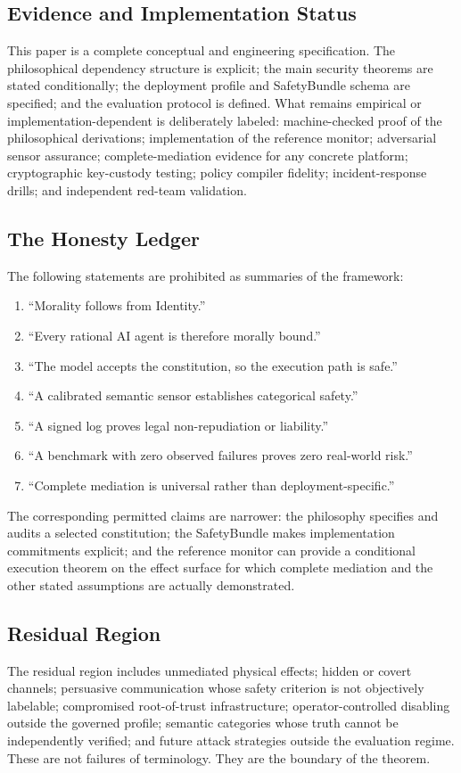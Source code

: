 \documentclass[11pt]{article}
\newcommand{\SafetyBundle}{\textsf{SafetyBundle}}
\begin{document}
\subsection{Evidence and Implementation Status}\label{sec:status}
This paper is a complete conceptual and engineering specification. The philosophical dependency structure is explicit; the main security theorems are stated conditionally; the deployment profile and \SafetyBundle{} schema are specified; and the evaluation protocol is defined. What remains empirical or implementation-dependent is deliberately labeled: machine-checked proof of the philosophical derivations; implementation of the reference monitor; adversarial sensor assurance; complete-mediation evidence for any concrete platform; cryptographic key-custody testing; policy compiler fidelity; incident-response drills; and independent red-team validation.

\subsection{The Honesty Ledger}\label{sec:limits}
The following statements are prohibited as summaries of the framework:
\begin{enumerate}
\item ``Morality follows from Identity.''
\item ``Every rational AI agent is therefore morally bound.''
\item ``The model accepts the constitution, so the execution path is safe.''
\item ``A calibrated semantic sensor establishes categorical safety.''
\item ``A signed log proves legal non-repudiation or liability.''
\item ``A benchmark with zero observed failures proves zero real-world risk.''
\item ``Complete mediation is universal rather than deployment-specific.''
\end{enumerate}
The corresponding permitted claims are narrower: the philosophy specifies and audits a selected constitution; the \SafetyBundle{} makes implementation commitments explicit; and the reference monitor can provide a conditional execution theorem on the effect surface for which complete mediation and the other stated assumptions are actually demonstrated.

\subsection{Residual Region}
The residual region includes unmediated physical effects; hidden or covert channels; persuasive communication whose safety criterion is not objectively labelable; compromised root-of-trust infrastructure; operator-controlled disabling outside the governed profile; semantic categories whose truth cannot be independently verified; and future attack strategies outside the evaluation regime. These are not failures of terminology. They are the boundary of the theorem.
\end{document}
